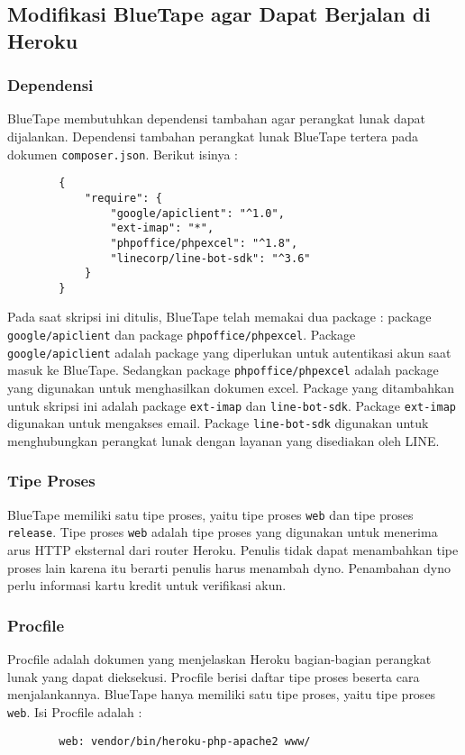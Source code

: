 \subsection{Modifikasi BlueTape agar Dapat Berjalan di Heroku}
	\subsubsection{Dependensi}
		BlueTape membutuhkan dependensi tambahan agar perangkat lunak dapat dijalankan. Dependensi tambahan perangkat lunak BlueTape tertera pada dokumen \texttt{composer.json}. Berikut isinya :
		\begin{lstlisting}
		{
		    "require": {
		        "google/apiclient": "^1.0",
				"ext-imap": "*",
		        "phpoffice/phpexcel": "^1.8",
		        "linecorp/line-bot-sdk": "^3.6"
		    }
		}
		\end{lstlisting}
		
		Pada saat skripsi ini ditulis, BlueTape telah memakai dua package : package \texttt{google/apiclient} dan package \texttt{phpoffice/phpexcel}. Package \texttt{google/apiclient} adalah package yang diperlukan untuk autentikasi akun saat masuk ke BlueTape. Sedangkan package \texttt{phpoffice/phpexcel} adalah package yang digunakan untuk menghasilkan dokumen excel. Package yang ditambahkan untuk skripsi ini adalah package \texttt{ext-imap} dan \texttt{line-bot-sdk}. Package \texttt{ext-imap} digunakan untuk mengakses email. Package \texttt{line-bot-sdk} digunakan untuk menghubungkan perangkat lunak dengan layanan yang disediakan oleh LINE.
		
	\subsubsection{Tipe Proses}
		BlueTape memiliki satu tipe proses, yaitu tipe proses \texttt{web} dan tipe proses \texttt{release}. Tipe proses \texttt{web} adalah tipe proses yang digunakan untuk menerima arus HTTP eksternal dari router Heroku. Penulis tidak dapat menambahkan tipe proses lain karena itu berarti penulis harus menambah dyno. Penambahan dyno perlu informasi kartu kredit untuk verifikasi akun.
		
	\subsubsection{Procfile}
		Procfile adalah dokumen yang menjelaskan Heroku bagian-bagian perangkat lunak yang dapat dieksekusi. Procfile berisi daftar tipe proses beserta cara menjalankannya. BlueTape hanya memiliki satu tipe proses, yaitu tipe proses \texttt{web}. Isi Procfile adalah :
		\begin{lstlisting}
		web: vendor/bin/heroku-php-apache2 www/
		\end{lstlisting}
		
